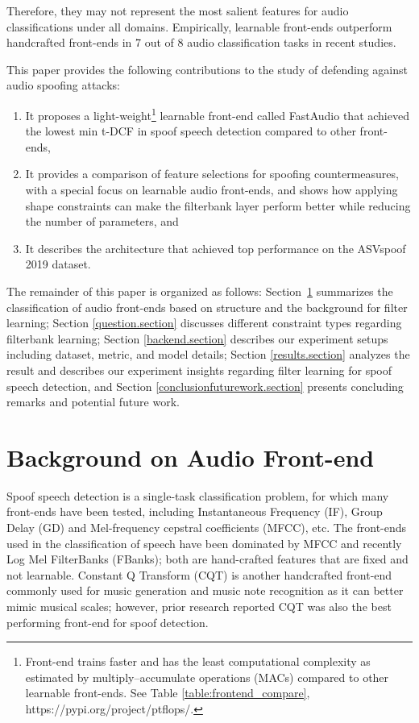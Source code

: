 \documentclass[conference]{IEEEtran}
\begin{document}
Therefore, they may not represent the most salient features for audio classifications under all domains. Empirically, learnable front-ends outperform handcrafted front-ends in 7 out of 8 audio classification tasks in recent studies\cite{Zeghidour2021LEAFAL}.

This paper provides the following contributions to the study of defending against audio spoofing attacks:

\begin{enumerate}

    \item It proposes a light-weight\footnote{Front-end trains faster and has the least computational complexity as estimated by multiply–accumulate operations (MACs) compared to other learnable front-ends. See Table \ref{table:frontend_compare}, https://pypi.org/project/ptflops/.} learnable front-end called FastAudio that achieved the lowest min t-DCF in spoof speech detection compared to other front-ends,
    \item It provides a comparison of feature selections for spoofing countermeasures, with a special focus on learnable audio front-ends, and shows how applying shape constraints can make the filterbank layer perform better while reducing the number of parameters, and
    \item It describes the architecture that achieved top performance on the ASVspoof 2019\cite{Todisco2019ASVspoof2F} dataset.
    
\end{enumerate}

The remainder of this paper is organized as follows: Section~\ref{bg.section} summarizes the classification of audio front-ends based on structure and the background for filter learning; Section \ref{question.section} discusses different constraint types regarding filterbank learning; Section \ref{backend.section} describes our experiment setups including dataset, metric, and model details;
Section \ref{results.section} analyzes the result and describes our experiment insights regarding filter learning for spoof speech detection, and Section \ref{conclusionfuturework.section} presents concluding remarks and potential future work.



\section{Background on Audio Front-end}
\label{bg.section}
Spoof speech detection is a single-task classification problem, for which many front-ends have been tested, including Instantaneous Frequency (IF), Group Delay (GD) and Mel-frequency cepstral coefficients (MFCC), etc. The front-ends used in the classification of speech have been dominated by MFCC and recently Log Mel FilterBanks (FBanks); both are hand-crafted features that are fixed and not learnable. Constant Q Transform (CQT)\cite{Brown1991CalculationOA} is another handcrafted front-end commonly used for music generation and music note recognition as it can better mimic musical scales; however, prior research reported CQT was also the best performing front-end for spoof detection\cite{Li2021ReplayAS}. 
\end{document}
